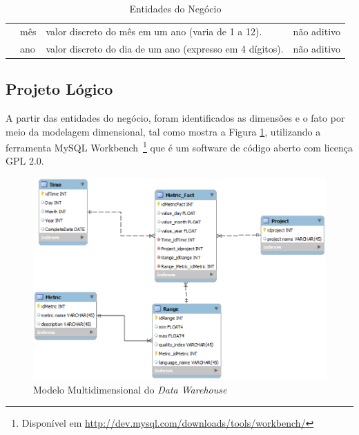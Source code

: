 \begin{table}[h]
\begin{tabular}{|p{2cm}|p{2.5cm}|p{4cm}|p{2cm}|}
                           
                           & mês                   & valor discreto do mês em um ano (varia de 1 a 12).  & não aditivo                 \\ \cline{2-4} 

                           & ano                   & valor discreto do dia de um ano (expresso em 4 dígitos).  & não aditivo                 \\ \cline{2-4} 

                \hline         
\end{tabular}
\caption{Entidades do Negócio}
\label{entidades}
\end{table}
\FloatBarrier





\subsection{Projeto Lógico}

A partir das entidades do negócio, foram identificados as dimensões e o fato por meio da modelagem dimensional, tal como mostra a Figura \ref{esquema}, utilizando a ferramenta MySQL Workbench~\footnote{Disponível em \url{http://dev.mysql.com/downloads/tools/workbench/}} que é um software de código aberto com licença GPL 2.0.


\begin{figure}[ht!]
\begin{center}
\includegraphics[keepaspectratio=true, scale=0.8]{figuras/modelo.eps}
\caption{Modelo Multidimensional do \textit{Data Warehouse}}
\label{esquema}
\end{center}
\end{figure}
\FloatBarrier

